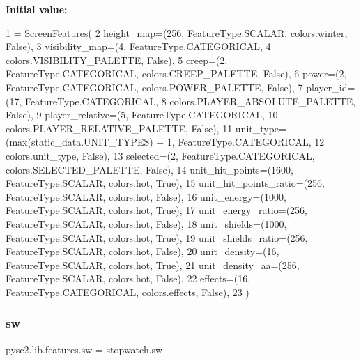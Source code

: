 {\bfseries Initial value\+:}
\begin{DoxyCode}
1 =  ScreenFeatures(
2     height\_map=(256, FeatureType.SCALAR, colors.winter, \textcolor{keyword}{False}),
3     visibility\_map=(4, FeatureType.CATEGORICAL,
4                     colors.VISIBILITY\_PALETTE, \textcolor{keyword}{False}),
5     creep=(2, FeatureType.CATEGORICAL, colors.CREEP\_PALETTE, \textcolor{keyword}{False}),
6     power=(2, FeatureType.CATEGORICAL, colors.POWER\_PALETTE, \textcolor{keyword}{False}),
7     player\_id=(17, FeatureType.CATEGORICAL,
8                colors.PLAYER\_ABSOLUTE\_PALETTE, \textcolor{keyword}{False}),
9     player\_relative=(5, FeatureType.CATEGORICAL,
10                      colors.PLAYER\_RELATIVE\_PALETTE, \textcolor{keyword}{False}),
11     unit\_type=(max(static\_data.UNIT\_TYPES) + 1, FeatureType.CATEGORICAL,
12                colors.unit\_type, \textcolor{keyword}{False}),
13     selected=(2, FeatureType.CATEGORICAL, colors.SELECTED\_PALETTE, \textcolor{keyword}{False}),
14     unit\_hit\_points=(1600, FeatureType.SCALAR, colors.hot, \textcolor{keyword}{True}),
15     unit\_hit\_points\_ratio=(256, FeatureType.SCALAR, colors.hot, \textcolor{keyword}{False}),
16     unit\_energy=(1000, FeatureType.SCALAR, colors.hot, \textcolor{keyword}{True}),
17     unit\_energy\_ratio=(256, FeatureType.SCALAR, colors.hot, \textcolor{keyword}{False}),
18     unit\_shields=(1000, FeatureType.SCALAR, colors.hot, \textcolor{keyword}{True}),
19     unit\_shields\_ratio=(256, FeatureType.SCALAR, colors.hot, \textcolor{keyword}{False}),
20     unit\_density=(16, FeatureType.SCALAR, colors.hot, \textcolor{keyword}{True}),
21     unit\_density\_aa=(256, FeatureType.SCALAR, colors.hot, \textcolor{keyword}{False}),
22     effects=(16, FeatureType.CATEGORICAL, colors.effects, \textcolor{keyword}{False}),
23 )
\end{DoxyCode}
\mbox{\label{namespacepysc2_1_1lib_1_1features_a062cf1836da62c7466fa1666e71541d3}} 
\subsubsection{\texorpdfstring{sw}{sw}}
{\footnotesize\ttfamily pysc2.\+lib.\+features.\+sw = stopwatch.\+sw}

